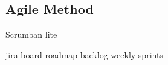 \subsection{Agile Method}
\begin{comment}
You need to describe briefly the life cycle model or research method that you used. You do not need to write about all of the different process models that you are aware of. Focus on the process model or research method that you have used. It is possible that you needed to adapt an existing method to suit your project; clearly identify what you used and how you adapted it for your needs.

For the research-oriented projects, there needs to be a suitable process for the construction of the software elements that support your work.
\end{comment}


\begin{comment}
what is it?
why am i using it?
\end{comment}

Scrumban lite

jira board
roadmap
backlog
weekly sprints
